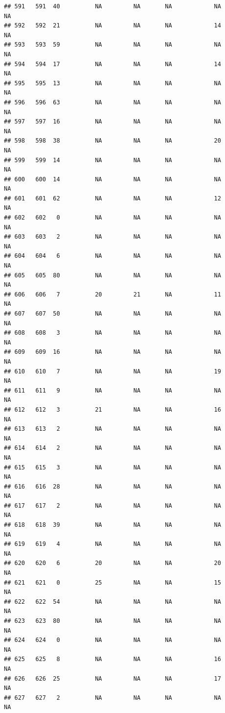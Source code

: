 \documentclass[man]{apa6}
\begin{document}
\begin{verbatim}
## 591   591  40          NA         NA       NA            NA       NA
## 592   592  21          NA         NA       NA            14       NA
## 593   593  59          NA         NA       NA            NA       NA
## 594   594  17          NA         NA       NA            14       NA
## 595   595  13          NA         NA       NA            NA       NA
## 596   596  63          NA         NA       NA            NA       NA
## 597   597  16          NA         NA       NA            NA       NA
## 598   598  38          NA         NA       NA            20       NA
## 599   599  14          NA         NA       NA            NA       NA
## 600   600  14          NA         NA       NA            NA       NA
## 601   601  62          NA         NA       NA            12       NA
## 602   602   0          NA         NA       NA            NA       NA
## 603   603   2          NA         NA       NA            NA       NA
## 604   604   6          NA         NA       NA            NA       NA
## 605   605  80          NA         NA       NA            NA       NA
## 606   606   7          20         21       NA            11       NA
## 607   607  50          NA         NA       NA            NA       NA
## 608   608   3          NA         NA       NA            NA       NA
## 609   609  16          NA         NA       NA            NA       NA
## 610   610   7          NA         NA       NA            19       NA
## 611   611   9          NA         NA       NA            NA       NA
## 612   612   3          21         NA       NA            16       NA
## 613   613   2          NA         NA       NA            NA       NA
## 614   614   2          NA         NA       NA            NA       NA
## 615   615   3          NA         NA       NA            NA       NA
## 616   616  28          NA         NA       NA            NA       NA
## 617   617   2          NA         NA       NA            NA       NA
## 618   618  39          NA         NA       NA            NA       NA
## 619   619   4          NA         NA       NA            NA       NA
## 620   620   6          20         NA       NA            20       NA
## 621   621   0          25         NA       NA            15       NA
## 622   622  54          NA         NA       NA            NA       NA
## 623   623  80          NA         NA       NA            NA       NA
## 624   624   0          NA         NA       NA            NA       NA
## 625   625   8          NA         NA       NA            16       NA
## 626   626  25          NA         NA       NA            17       NA
## 627   627   2          NA         NA       NA            NA       NA

\end{verbatim}
\end{document}

